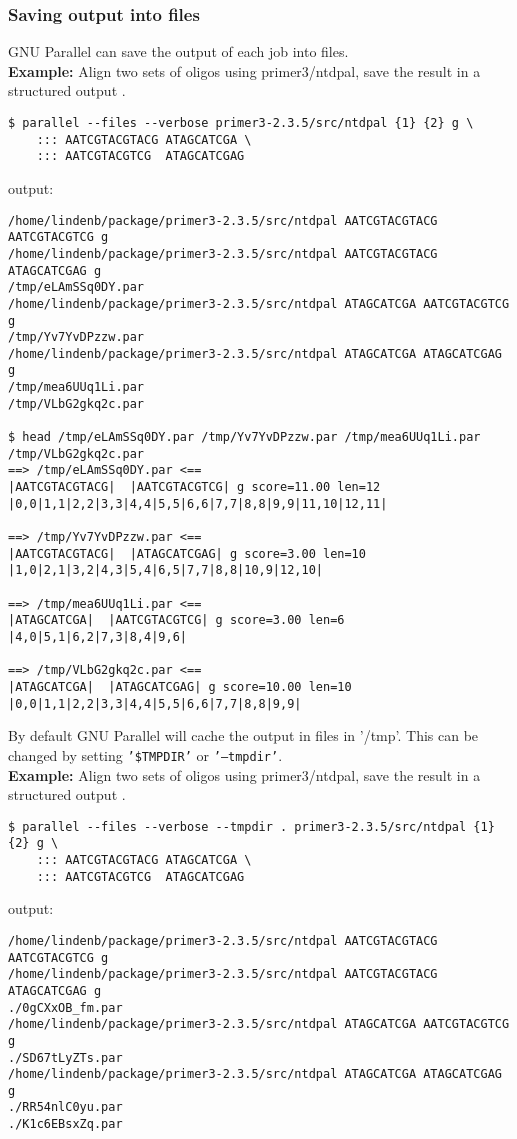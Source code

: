 \documentclass{article}
\newcommand{\example}[1]{
\textbf{Example: } {\color[rgb]{0,0,1} #1 } .
}
\newcommand{\cmdoption}[1]{\texttt{'#1'}}
\begin{document}
\subsubsection{Saving output into files}
GNU Parallel can save the output of each job into files.\\
\example{Align two sets of oligos using primer3/ntdpal, save the result in a structured output}
\begin{lstlisting}
$ parallel --files --verbose primer3-2.3.5/src/ntdpal {1} {2} g \
	::: AATCGTACGTACG ATAGCATCGA \
	::: AATCGTACGTCG  ATAGCATCGAG
\end{lstlisting}
output:
\begin{lstlisting}
/home/lindenb/package/primer3-2.3.5/src/ntdpal AATCGTACGTACG AATCGTACGTCG g
/home/lindenb/package/primer3-2.3.5/src/ntdpal AATCGTACGTACG ATAGCATCGAG g
/tmp/eLAmSSq0DY.par
/home/lindenb/package/primer3-2.3.5/src/ntdpal ATAGCATCGA AATCGTACGTCG g
/tmp/Yv7YvDPzzw.par
/home/lindenb/package/primer3-2.3.5/src/ntdpal ATAGCATCGA ATAGCATCGAG g
/tmp/mea6UUq1Li.par
/tmp/VLbG2gkq2c.par

$ head /tmp/eLAmSSq0DY.par /tmp/Yv7YvDPzzw.par /tmp/mea6UUq1Li.par /tmp/VLbG2gkq2c.par
==> /tmp/eLAmSSq0DY.par <==
|AATCGTACGTACG|  |AATCGTACGTCG| g score=11.00 len=12 |0,0|1,1|2,2|3,3|4,4|5,5|6,6|7,7|8,8|9,9|11,10|12,11|

==> /tmp/Yv7YvDPzzw.par <==
|AATCGTACGTACG|  |ATAGCATCGAG| g score=3.00 len=10 |1,0|2,1|3,2|4,3|5,4|6,5|7,7|8,8|10,9|12,10|

==> /tmp/mea6UUq1Li.par <==
|ATAGCATCGA|  |AATCGTACGTCG| g score=3.00 len=6 |4,0|5,1|6,2|7,3|8,4|9,6|

==> /tmp/VLbG2gkq2c.par <==
|ATAGCATCGA|  |ATAGCATCGAG| g score=10.00 len=10 |0,0|1,1|2,2|3,3|4,4|5,5|6,6|7,7|8,8|9,9|
\end{lstlisting}

By default GNU Parallel will cache the output in files in '/tmp'. This can be changed by setting \cmdoption{\$TMPDIR} or \cmdoption{--tmpdir}.\\
\example{Align two sets of oligos using primer3/ntdpal, save the result in a structured output}
\begin{lstlisting}
$ parallel --files --verbose --tmpdir . primer3-2.3.5/src/ntdpal {1} {2} g \
	::: AATCGTACGTACG ATAGCATCGA \
	::: AATCGTACGTCG  ATAGCATCGAG
\end{lstlisting}
output:
\begin{lstlisting}
/home/lindenb/package/primer3-2.3.5/src/ntdpal AATCGTACGTACG AATCGTACGTCG g
/home/lindenb/package/primer3-2.3.5/src/ntdpal AATCGTACGTACG ATAGCATCGAG g
./0gCXxOB_fm.par
/home/lindenb/package/primer3-2.3.5/src/ntdpal ATAGCATCGA AATCGTACGTCG g
./SD67tLyZTs.par
/home/lindenb/package/primer3-2.3.5/src/ntdpal ATAGCATCGA ATAGCATCGAG g
./RR54nlC0yu.par
./K1c6EBsxZq.par
\end{lstlisting}
\end{document}
